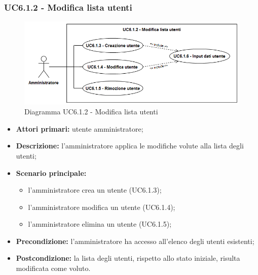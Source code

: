 \subsubsection{UC6.1.2 - Modifica lista utenti}
	\begin{figure}[H]
		\centering
		\includegraphics[width=14cm]{images/UC6.1.2.png}
		\caption{Diagramma UC6.1.2 - Modifica lista utenti}
	\end{figure}
	\begin{itemize}
		\item \textbf{Attori primari:} utente amministratore;
		\item \textbf{Descrizione:} l'amministratore applica le modifiche volute alla lista degli utenti;
		\item \textbf{Scenario principale:} 
		\begin{itemize}
			\item l'amministratore crea un utente (UC6.1.3);
			\item l'amministratore modifica un utente (UC6.1.4);
			\item l'amministratore elimina un utente (UC6.1.5);
		\end{itemize}
		\item \textbf{Precondizione:} l'amministratore ha accesso all'elenco degli utenti esistenti;
		\item \textbf{Postcondizione:} la lista degli utenti, rispetto allo stato iniziale, risulta modificata come voluto.
	\end{itemize}

